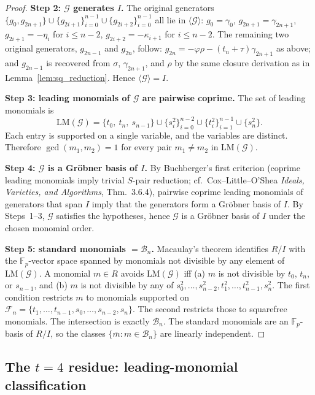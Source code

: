 \documentclass[11pt,a4paper]{article}
\theoremstyle{definition}
\newcommand{\F}{\mathbb{F}}
\begin{document}
\begin{proof}
\medskip
\noindent\textbf{Step 2: $\mathcal{G}$ generates $I$.}
The original generators $\{g_0, g_{2n+1}\} \cup \{g_{2i+1}\}_{i=0}^{n-1}
\cup \{g_{2i+2}\}_{i=0}^{n-1}$ all lie in $\langle \mathcal{G} \rangle$:
$g_0 = \gamma_0$, $g_{2n+1} = \gamma_{2n+1}$, $g_{2i+1} = -\eta_i$ for
$i \leq n-2$, $g_{2i+2} = -\kappa_{i+1}$ for $i \leq n-2$. The
remaining two original generators, $g_{2n-1}$ and $g_{2n}$, follow:
$g_{2n} = -\varphi \rho - (t_n + \tau)\gamma_{2n+1}$ as above; and
$g_{2n-1}$ is recovered from $\sigma$, $\gamma_{2n+1}$, and $\rho$ by
the same closure derivation as in Lemma~\ref{lem:sq_reduction}. Hence
$\langle \mathcal{G} \rangle = I$.

\medskip
\noindent\textbf{Step 3: leading monomials of $\mathcal{G}$ are
pairwise coprime.}
The set of leading monomials is
\[
\mathrm{LM}(\mathcal{G}) = \{ t_0,\ t_n,\ s_{n-1} \} \cup
\{ s_i^2 \}_{i=0}^{n-2} \cup \{ t_i^2 \}_{i=1}^{n-1} \cup \{ s_n^2 \}.
\]
Each entry is supported on a single variable, and the variables are
distinct. Therefore $\gcd(m_1, m_2) = 1$ for every pair $m_1 \neq m_2$
in $\mathrm{LM}(\mathcal{G})$.

\medskip
\noindent\textbf{Step 4: $\mathcal{G}$ is a Gr\"obner basis of $I$.}
By Buchberger's first criterion (coprime leading monomials imply
trivial $S$-pair reduction; cf.\ Cox--Little--O'Shea
\emph{Ideals, Varieties, and Algorithms}, Thm.~3.6.4), pairwise coprime
leading monomials of generators that span $I$ imply that the
generators form a Gr\"obner basis of $I$. By Steps~1--3, $\mathcal{G}$
satisfies the hypotheses, hence $\mathcal{G}$ is a Gr\"obner basis of
$I$ under the chosen monomial order.

\medskip
\noindent\textbf{Step 5: standard monomials $= \mathcal{B}_n$.}
Macaulay's theorem identifies $R/I$ with the $\F_p$-vector space
spanned by monomials not divisible by any element of
$\mathrm{LM}(\mathcal{G})$. A monomial $m \in R$ avoids
$\mathrm{LM}(\mathcal{G})$ iff (a) $m$ is not divisible by $t_0$,
$t_n$, or $s_{n-1}$, and (b) $m$ is not divisible by any of
$s_0^2, \ldots, s_{n-2}^2, t_1^2, \ldots, t_{n-1}^2, s_n^2$. The first
condition restricts $m$ to monomials supported on
$\mathcal{F}_n = \{t_1, \ldots, t_{n-1}, s_0, \ldots, s_{n-2}, s_n\}$.
The second restricts those to squarefree monomials. The intersection
is exactly $\mathcal{B}_n$. The standard monomials are an $\F_p$-basis
of $R/I$, so the classes $\{\bar m : m \in \mathcal{B}_n\}$ are
linearly independent.
\end{proof}

\subsection*{The $t = 4$ residue: leading-monomial
classification}\label{app:dreg:t4}
\end{document}
